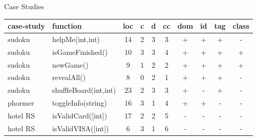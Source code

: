 \documentclass{beamer}
\begin{document}
\begin{frame}{Case Studies}
\setlength\tabcolsep{3pt}
\begin{table}[!t]
    \tiny
    \centering
  \begin{tabular}{l|l|c|c|c|c|c|c|c|c}
    \toprule
    \textbf{case-study} & \textbf{function} & \textbf{loc} & \textbf{c} & \textbf{d} & \textbf{cc} & \textbf{dom} & \textbf{id} & \textbf{tag} & \textbf{class} \\
    \hline
    sudoku     & helpMe(int,int)    & 14 & 2 & 3 & 3 & + & + & + & - \\
    sudoku     & isGameFinished()    & 10 & 3 & 3 & 4 & + & + & + & + \\
    sudoku     & newGame()           & 9  & 1 & 2 & 2 & + & + & + & + \\
    sudoku     & revealAll()         & 8  & 0 & 2 & 1 & + & + & + & - \\
    sudoku     & shuffleBoard(int,int)      & 23 & 2 & 3 & 3 & + & - & + & - \\
    \hline
    phormer    & toggleInfo(string)                                                     & 16 & 3 & 1 & 4 & + & + & - & - \\
    \hline
    hotel RS   & isValidCard([int])           & 17 & 2 & 2 & 5 & - & - & - & - \\
    hotel RS   & isValidVISA([int])           & 6  & 3 & 1 & 6 & - & - & - & - \\

\end{tabular}
\end{table}
\end{frame}
\end{document}
